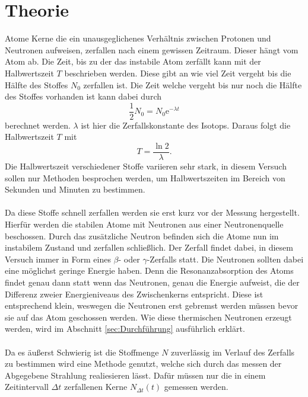 \section{Theorie}
\label{sec:Theorie}

Atome Kerne die ein unausgeglichenes Verhältnis zwischen Protonen und Neutronen aufweisen, zerfallen nach einem gewissen Zeitraum.
Dieser hängt vom Atom ab.
Die Zeit, bis zu der das instabile Atom zerfällt kann mit der Halbwertszeit $T$ beschrieben werden.
Diese gibt an wie viel Zeit vergeht bis die Hälfte des Stoffes $N_0$ zerfallen ist.
Die Zeit welche vergeht bis nur noch die Hälfte des Stoffes vorhanden ist kann dabei durch 
\begin{equation*}
    \frac{1}{2}N_0 = N_0 \text{e}^{-\lambda t}
\end{equation*}
berechnet werden.
$\lambda$ ist hier die Zerfallskonstante des Isotops.
Daraus folgt die Halbwertszeit $T$ mit 
\begin{equation}
    T = \frac{\ln{2}}{\lambda}.
    \label{eqn:Halbwertszeit}
\end{equation}
Die Halbwertszeit verschiedener Stoffe variieren sehr stark, in diesem Versuch sollen nur Methoden besprochen werden, 
um Halbwertszeiten im Bereich von Sekunden und Minuten zu bestimmen.
\\\\
Da diese Stoffe schnell zerfallen werden sie erst kurz vor der Messung hergestellt.
Hierfür werden die stabilen Atome mit Neutronen aus einer Neutronenquelle beschossen.
Durch das zusätzliche Neutron befinden sich die Atome nun im instabilem Zustand und zerfallen schließlich.
Der Zerfall findet dabei, in diesem Versuch immer in Form eines $\beta$- oder $\gamma$-Zerfalls statt.
Die Neutronen sollten dabei eine möglichst geringe Energie haben.
Denn die Resonanzabsorption des Atoms findet genau dann statt wenn das Neutronen, genau die Energie aufweist, die der Differenz zweier Energieniveaus des Zwischenkerns entspricht.
Diese ist entsprechend klein, weswegen die Neutronen erst gebremst werden müssen bevor sie auf das Atom geschossen werden.
Wie diese thermischen Neutronen erzeugt werden, wird im Abschnitt \ref{sec:Durchführung} ausführlich erklärt.
\\\\
Da es äußerst Schwierig ist die Stoffmenge $N$ zuverlässig im Verlauf des Zerfalls zu bestimmen wird eine Methode genutzt, welche sich durch das messen der Abgegebene Strahlung realiesieren lässt.
Dafür müssen nur die in einem Zeitintervall $\Delta t$ zerfallenen Kerne $N_{\Delta t}(t)$ gemessen werden.
